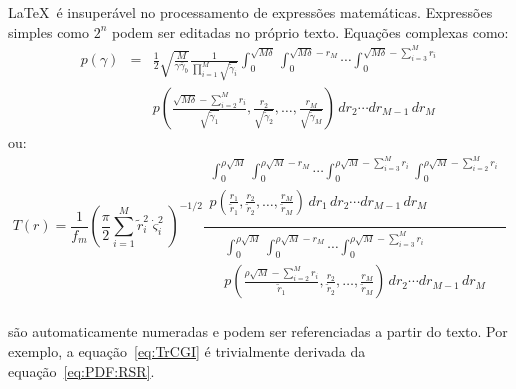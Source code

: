 \LaTeX~é insuperável no processamento de expressões matemáticas. Expressões
simples como $2^{n}$ podem ser editadas no próprio texto. Equações
complexas como:
\begin{eqnarray} \label{eq:PDF:RSR}
  p \left( \gamma \right) & = & \frac{1}{2} \sqrt{\frac{M}{\gamma \bar{\gamma}_{b}}} \frac{1}{ \prod_{i=1}^M {\sqrt{\tilde{\gamma}_i}}}
  \int_0^{\sqrt{M \delta}} \int_0^{\sqrt{M \delta} - r_M } \cdots
  \int_0^{\sqrt{M \delta} - \sum_{i = 3}^M {r_i } } \nonumber \\
  & & p \left( {\frac{\sqrt{M \delta} - \sum_{i = 2}^M {r_i }}{\sqrt{\tilde{\gamma}_1}} ,
  \frac{r_2}{\sqrt{\tilde{\gamma}_2}} , \ldots ,\frac{r_M}{\sqrt{\tilde{\gamma}_M}} } \right)
  \, dr_2 \cdots dr_{M-1} \, dr_M
\end{eqnarray}
ou:
\begin{equation} \label{eq:TrCGI}
  T(r) = \frac{1}{f_m}
  \left( \frac{\pi}{2} \sum_{i=1}^M
  {\tilde{r}_i^2 \dot{\varsigma}_i^2}\right)^{-1/2}
  \frac
  {\begin{array}{ll}
  \int_0^{\rho \sqrt{M}} \int_0^{\rho \sqrt{M} - r_M } \cdots
  \int_0^{\rho \sqrt{M} - \sum_{i = 3}^M {r_i } } \int_0^{\rho \sqrt{M} -
  \sum_{i = 2}^M {r_i } }  \\
  p \left( {\frac{r_1}{\tilde{r}_1} ,
  \frac{r_2}{\tilde{r}_2} , \ldots ,\frac{r_M}{\tilde{r}_M} } \right)
  \, dr_1 \, dr_2 \cdots dr_{M-1} \, dr_M \\ \end{array}}
  {\begin{array}{ll}
  \int_0^{\rho \sqrt{M}} \int_0^{\rho \sqrt{M} - r_M } \cdots
  \int_0^{\rho \sqrt{M} - \sum_{i = 3}^M {r_i } } \\
  p \left( {\frac{\rho \sqrt{M} - \sum_{i = 2}^M {r_i }}{\tilde{r}_1} ,
  \frac{r_2}{\tilde{r}_2} , \ldots ,\frac{r_M}{\tilde{r}_M} } \right)
  \, dr_2 \cdots dr_{M-1} \, dr_M \\ \end{array}}
\end{equation}

são automaticamente numeradas e podem ser referenciadas a partir do
texto. Por exemplo, a equação~\ref{eq:TrCGI} é trivialmente derivada
da equação~\ref{eq:PDF:RSR}.

